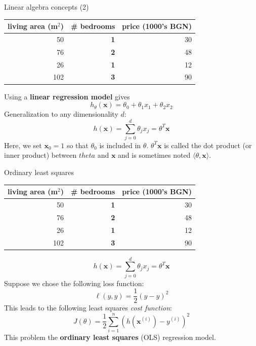 \documentclass{beamer}
\newcommand{\yhat}{\hat{y}}
\newcommand{\bxi}{\bm{x}^{(i)}}
\newcommand{\bx}{\bm{x}}
\newcommand{\yi}{y^{(i)}}
\newcommand{\1}[1]{\mathbbm{1}\left[#1\right]}
\begin{document}
\begin{frame}{Linear algebra concepts (2)}
\begin{table}
\centering
\begin{tabular}{r|r|r}
living area (m$^2$) &  \textbf{\# bedrooms} & price (1000's BGN) \\\hline
50 & \textbf{1} & 30\\
76 & \textbf{2} & 48\\
26 & \textbf{1} & 12\\
102 & \textbf{3} & 90\\
\end{tabular}
\end{table}
\vfill
\pause
Using a \textbf{linear regression model} gives
\begin{equation*}
h_\theta(\bx) = \theta_0 + \theta_1 x_1 + \theta_2 x_2
\end{equation*}
Generalization to any dimensionality $d$:
\begin{equation*}
h(\bx) = \sum_{j = 0}^{d} \theta_j x_j = \theta^T \bx
\end{equation*}
Here, we set $\bx_0 = 1$ so that $\theta_0$ is included in $\theta$. $\theta^T \bx$ is called the dot product (or inner product) between $theta$ and $\bx$ and is sometimes noted $\langle {\theta, \bx} \rangle$.
\end{frame}

\begin{frame}{Ordinary least squares}
\begin{table}
\centering
\begin{tabular}{r|r|r}
living area (m$^2$) &  \textbf{\# bedrooms} & price (1000's BGN) \\\hline
50 & \textbf{1} & 30\\
76 & \textbf{2} & 48\\
26 & \textbf{1} & 12\\
102 & \textbf{3} & 90\\
\end{tabular}
\end{table}
\vfill
\begin{equation*}
h(\bx) = \sum_{j = 0}^{d} \theta_j x_j = \theta^T \bx
\end{equation*}
\pause
\vfill
Suppose we chose the following loss function:
\begin{equation*}
\ell \left( y, \yhat \right) = \dfrac{1}{2} \left( y - \yhat \right)^2
\end{equation*}
This leads to the following least squares \textit{cost function}:
\begin{equation*}
J(\theta) = \dfrac{1}{2} \sum_{i = 1}^{n} \left( h\left(\bxi\right) - \yi \right)^2
\end{equation*}
This problem the \textbf{ordinary least squares} (OLS) regression model.
\end{frame}
\end{document}
